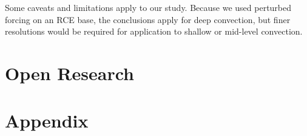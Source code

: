 \documentclass[draft]{agujournal2019}
\begin{document}
Some caveats and limitations apply to our study.  Because we used perturbed
forcing on an RCE base, the conclusions apply for deep convection, but finer
resolutions would be required for application to shallow or mid-level
convection.

\section{Open Research}



%



\newpage
\section*{Appendix}
\setcounter{figure}{0}
\renewcommand{\thefigure}{A\arabic{figure}}
\end{document}
